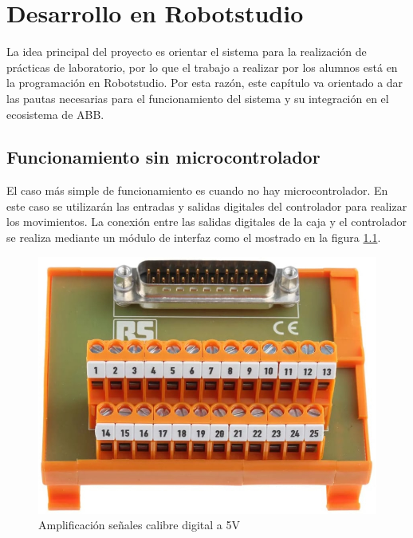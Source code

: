 \chapter{Desarrollo en Robotstudio}\label{chp-06}

La idea principal del proyecto es orientar el sistema para la realización de prácticas de 
laboratorio, por lo que el trabajo a realizar por los alumnos está en la programación en 
Robotstudio. Por esta razón, este capítulo va orientado a dar las pautas necesarias para el 
funcionamiento del sistema y su integración en el ecosistema de ABB.

\section{Funcionamiento sin microcontrolador}

El caso más simple de funcionamiento es cuando no hay microcontrolador. En este caso se
utilizarán las entradas y salidas digitales del controlador para realizar los movimientos.
La conexión entre las salidas digitales de la caja y el controlador se realiza mediante 
un módulo de interfaz como el mostrado en la figura \ref{fig:interfazfisicadigital}.

\begin{figure}[hbtp]
    \centering
    \includegraphics[width=\textwidth/2]{06-robotstudio/interfazdigital.jpg}
    \caption{Amplificación señales calibre digital a 5V}
    \label{fig:interfazfisicadigital}
    \end{figure}

